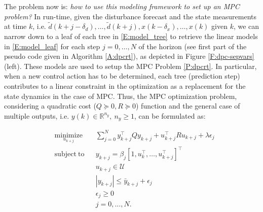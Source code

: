 \textcolor[rgb]{0,0,1}{The problem now is: \emph{how to use this modeling framework to set up an MPC problem?} In run-time, given the disturbance forecast and the state measurements at time $k$, i.e. $\tilde d(k+j-\delta_d),\ldots,\tilde d(k+j),x(k-\delta_x),\ldots,x(k)$ given $k$, we can narrow down to a leaf of each tree in \eqref{E:model_tree} to retrieve the linear models in \eqref{E:model_leaf} for each step $j=0,\ldots,N$ of the horizon (see first part of the pseudo code given in Algorithm \ref{A:dpcrt}), as depicted in Figure \ref{F:dpc-sepvars} (left). These models are used to setup the MPC Problem \ref{P:dpcrt}.
In particular, }when a new control action has to be determined, each tree (prediction step) contributes to a linear constraint in the optimization as a replacement for the state dynamics in the case of MPC. Thus, the MPC optimization problem, considering a quadratic cost ($Q \succeq 0, R \succeq 0$) function and the general case of multiple outputs, i.e. $y(k)\in\mathbb{R}^{n_y},\ n_y\geq 1$, can be formulated as:

\begin{problem}\label{P:dpcrt}
	\begin{equation}
	\begin{aligned}
	& \underset{u_{k+j}}{\mathrm{minimize}} & & \sum_{j=0}^{N} y^\top_{k+j} Q y_{k+j} + u^\top_{k+j} R u_{k+j} + \lambda\epsilon_j \\
	& \mathrm{subject\ to }                 & & y_{k+j}     =   \beta_j [1,u^\top_{k},\ldots,u^\top_{k+j} ]^\top                   \\
	&                                       & & u_{k+j}    \in  \mathcal{U}                                                        \\
	&                                       & & |y_{k+j}|  \leq \bar{y}_{k+j} + \epsilon_j 										   \\
	&                                       & & \epsilon_j \geq  0							                                       \\
	&                                       & & j           =    0,\ldots,N.            									       \\
	\end{aligned}
	\label{E:dpcrt}
	\end{equation}
\end{problem}

